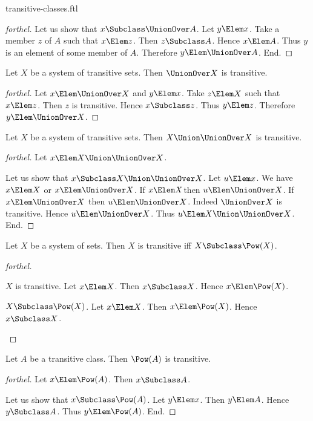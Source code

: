 \documentclass{stex}
\begin{document}
\begin{smodule}{transitive-classes.ftl}
\begin{proof}[forthel]
  Let us show that $x \Subclass \UnionOver A$.
    Let $y \Elem x$.
    Take a member $z$ of $A$ such that $x \Elem z$.
    Then $z \Subclass A$.
    Hence $x \Elem A$.
    Thus $y$ is an element of some member of $A$.
    Therefore $y \Elem \UnionOver A$.
  End.
\end{proof}

\begin{proposition*}[forthel]
  Let $X$ be a system of transitive sets.
  Then $\UnionOver X$ is transitive.
\end{proposition*}
\begin{proof}[forthel]
  Let $x \Elem \UnionOver X$ and $y \Elem x$.
  Take $z \Elem X$ such that $x \Elem z$.
  Then $z$ is transitive.
  Hence $x \Subclass z$.
  Thus $y \Elem z$.
  Therefore $y \Elem \UnionOver X$.
\end{proof}

\begin{proposition*}[forthel]
  Let $X$ be a system of transitive sets.
  Then $X \Union \UnionOver X$ is transitive.
\end{proposition*}
\begin{proof}[forthel]
  Let $x \Elem X \Union \UnionOver X$.

  Let us show that $x \Subclass X \Union \UnionOver X$.
    Let $u \Elem x$.
    We have $x \Elem X$ or $x \Elem \UnionOver X$.
    If $x \Elem X$then $u \Elem \UnionOver X$.
    If $x \Elem \UnionOver X$ then $u \Elem \UnionOver X$.
    Indeed $\UnionOver X$ is transitive.
    Hence $u \Elem \UnionOver X$.
    Thus $u \Elem X \Union \UnionOver X$.
  End.
\end{proof}

\begin{proposition*}[forthel]
  Let $X$ be a system of sets.
  Then $X$ is transitive iff $X \Subclass \Pow(X)$.
\end{proposition*}
\begin{proof}[forthel]
  \begin{case}{$X$ is transitive.}
    Let $x \Elem X$.
    Then $x \Subclass X$.
    Hence $x \Elem \Pow(X)$.
  \end{case}

  \begin{case}{$X \Subclass \Pow(X)$.}
    Let $x \Elem X$.
    Then $x \Elem \Pow(X)$.
    Hence $x \Subclass X$.
  \end{case}
\end{proof}

\begin{proposition*}[forthel]
  Let $A$ be a transitive class.
  Then $\Pow(A)$ is transitive.
\end{proposition*}
\begin{proof}[forthel]
  Let $x \Elem \Pow(A)$.
  Then $x \Subclass A$.

  Let us show that $x \Subclass \Pow(A)$.
    Let $y \Elem x$.
    Then $y \Elem A$.
    Hence $y \Subclass A$.
    Thus $y \Elem \Pow(A)$.
  End.
\end{proof}

\end{smodule}
\end{document}

